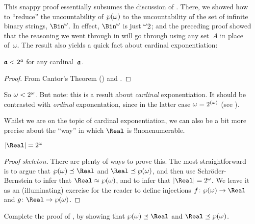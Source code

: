 \documentclass[../../../include/open-logic-section]{subfiles}
\begin{document}
This snappy proof essentially subsumes the discussion of
. There, we showed how to ``reduce'' the
uncountability of $\wp(\omega)$ to the uncountability of the set of
infinite binary strings, $\Bin^\omega$. In effect, $\Bin^{\omega}$ is
just ${}^{\omega}{2}$; and the preceding proof showed that the
reasoning we went through in  will go
through using any set~$A$ in place of~$\omega$. The result also yields
a quick fact about cardinal exponentiation:

\begin{cor}
$\mathfrak{a} < 2^{\mathfrak{a}}$ for any cardinal~$\mathfrak{a}$.
\end{cor}

\begin{proof}
From Cantor's Theorem () and
.
\end{proof}

So $\omega < 2^{\omega}$. But note: this is a result about
\emph{cardinal} exponentiation. It should be contrasted with
\emph{ordinal} exponentation, since in the latter case $\omega =
2^{(\omega)}$ (see ).

Whilst we are on the topic of cardinal exponentiation, we can also be
a bit more precise about the ``way'' in which $\Real$ is
!!{nonenumerable}.

\begin{thm}
$\card{\Real} = \cardexpo{2}{\omega}$
\end{thm}

\begin{proof}[Proof skeleton]
There are plenty of ways to prove this. The most straightforward is to
argue that $\cardle{\Pow{\omega}}{\Real}$ and
$\cardle{\Real}{\Pow{\omega}}$, and then use Schr\"oder-Bernstein to
infer that $\cardeq{\Real}{\Pow{\omega}}$, and
 to infer
that $\card{\Real} = \cardexpo{2}{\omega}$. We leave it as an
(illuminating) exercise for the reader to define injections $f \colon
\Pow{\omega} \to \Real$ and $g \colon \Real \to \Pow{\omega}$.
\end{proof}

\begin{prob}
Complete the proof of
, by
showing that $\cardle{\Pow{\omega}}{\Real}$ and
$\cardle{\Real}{\Pow{\omega}}$.
\end{prob}
\end{document}
